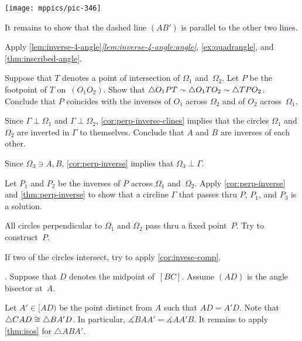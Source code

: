 \begin{multicols}{2}
\begin{Figure}
\centering
\texttt{[image: mppics/pic-346]}
\end{Figure}

It remains to show that the dashed line $(AB')$ is parallel to the other two lines.

Apply \ref{lem:inverse-4-angle}\textit{\ref{lem:inverse-4-angle:angle}}, 
\ref{ex:quadrangle},
and \ref{thm:inscribed-angle}.

Suppose that $T$ denotes a point of intersection of $\Omega_1$ and~$\Omega_2$.
Let $P$ be the footpoint of $T$ on~$(O_1O_2)$.
Show that
$\triangle O_1PT
\z\sim \triangle O_1TO_2
\z\sim \triangle TPO_2$.
Conclude that $P$ coincides with the inverses of $O_1$ across $\Omega_2$ and of $O_2$ across~$\Omega_1$.

Since $\Gamma\perp\Omega_1$ and $\Gamma\perp\Omega_2$,
\ref{cor:perp-inverse-clines} 
implies that
the circles $\Omega_1$ and $\Omega_2$ are inverted in $\Gamma$ 
to themselves.
Conclude that $A$ and $B$ are inverses of each other.

Since $\Omega_3\ni A,B$,
\ref{cor:perp-inverse} implies that
$\Omega_3\perp \Gamma$.

Let $P_1$ and $P_2$ be the inverses of $P$ 
across $\Omega_1$ and~$\Omega_2$.
Apply \ref{cor:perp-inverse} and \ref{thm:perp-inverse}
to show that a circline $\Gamma$ that passes thru $P$, $P_1$, and $P_3$ is a solution.

All circles perpendicular to $\Omega_1$ and $\Omega_2$ pass thru a fixed point~$P$.
Try to construct~$P$.

If two of the circles intersect, try to apply \ref{cor:invese-comp}.

\setcounter{eqtn}{0}

\parbf{\ref{ex:abs-bisect=median}}.
Suppose that $D$ denotes the midpoint of~$[BC]$.
Assume $(AD)$ is the angle bisector at~$A$.

Let $A'\in [AD)$ be the point distinct from $A$ such that $AD=A'D$.
Note that $\triangle CAD\z\cong\triangle BA'D$.
In particular, $\measuredangle BAA'=\measuredangle AA'B$.
It remains to apply \ref{thm:isos} for $\triangle ABA'$.


\end{multicols}
